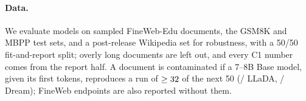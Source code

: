 \paragraph{Data.}
We evaluate models on sampled FineWeb-Edu documents, the GSM8K \citep{cobbe2021gsm8k} and MBPP \citep{austin2021mbpp} test sets, and a post-release Wikipedia set for robustness, with a 50/50 fit-and-report split; overly long documents are left out, and every C1 number comes from the report half. A document is contaminated if a 7--8B Base model, given its first \VivaLladaContamPrefix{} tokens, reproduces a run of $\ge32$ of the next 50 (\VivaLladaContamFlagged/\VivaLladaContamDocs{} LLaDA, \VivaDreamContamFlagged/\VivaDreamContamDocs{} Dream); FineWeb endpoints are also reported without them.

